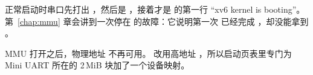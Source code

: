 正常启动时串口先打出 ，然后是 ，接着才是  的第一行 “xv6 kernel is booting”。第~\ref{chap:mmu} 章会讲到一次停在  的故障：它说明第一次  已经完成 ，却没能拿到 。

MMU 打开之后，物理地址  不再可用。 改用高地址 ，所以启动页表里专门为 Mini UART 所在的 2\,MiB 块加了一个设备映射。
